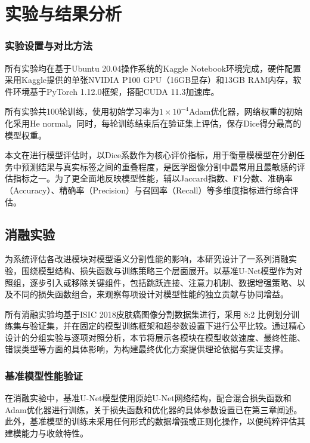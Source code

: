 \section{实验与结果分析}

\subsubsection{实验设置与对比方法}

所有实验均在基于Ubuntu 20.04操作系统的Kaggle Notebook环境完成，硬件配置采用Kaggle提供的单张NVIDIA P100 GPU（16GB显存）和13GB RAM内存，软件环境基于PyTorch 1.12.0框架，搭配CUDA 11.3加速库。

所有实验共100轮训练，使用初始学习率为$ 1 \times 10^{-4} $Adam优化器，网络权重的初始化采用He normal。同时，每轮训练结束后在验证集上评估，保存Dice得分最高的模型权重。

本文在进行模型评估时，以Dice系数作为核心评价指标，用于衡量模模型在分割任务中预测结果与真实标签之间的重叠程度，是医学图像分割中最常用且最敏感的评估指标之一。为了更全面地反映模型性能，辅以Jaccard指数、F1分数、准确率（Accuracy）、精确率（Precision）与召回率（Recall）等多维度指标进行综合评估。

\subsection{消融实验}

为系统评估各改进模块对模型语义分割性能的影响，本研究设计了一系列消融实验，围绕模型结构、损失函数与训练策略三个层面展开。以基准U-Net模型作为对照组，逐步引入或移除关键组件，包括跳跃连接、注意力机制、数据增强策略、以及不同的损失函数组合，来观察每项设计对模型性能的独立贡献与协同增益。

所有消融实验均基于ISIC 2018皮肤癌图像分割数据集进行，采用 8:2 比例划分训练集与验证集，并在固定的模型训练框架和超参数设置下进行公平比较。通过精心设计的分组实验与逐项对照分析，本节将展示各模块在模型收敛速度、最终性能、错误类型等方面的具体影响，为构建最终优化方案提供理论依据与实证支撑。

\subsubsection{基准模型性能验证}

在消融实验中，基准U-Net模型使用原始U-Net网络结构，配合混合损失函数和Adam优化器进行训练，关于损失函数和优化器的具体参数设置已在第三章阐述。此外，基准模型的训练未采用任何形式的数据增强或正则化操作，以便纯粹评估其建模能力与收敛特性。

